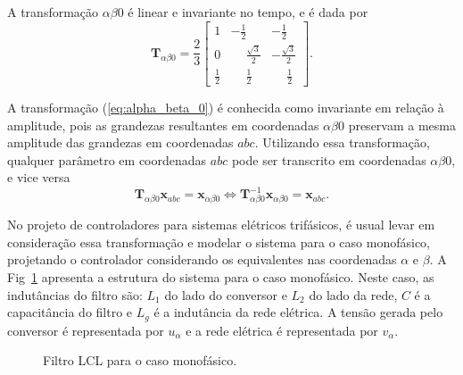   A transformação $\alpha \beta 0$ é linear e invariante no tempo, e é dada por
  \begin{equation}
    \mathbf{T}_{\alpha \beta 0} = \frac{2}{3} \left[
    \begin{array}{ccc}
      1 & -\frac{1}{2} & -\frac{1}{2} \\[0.3em]
      0 & \phantom{-}\frac{\sqrt{3}}{2} & -\frac{\sqrt{3}}{2} \\[0.3em]
      \frac{1}{2} &  \phantom{-}\frac{1}{2} & \phantom{-}\frac{1}{2}
    \end{array}
    \right] \text{.}
    \label{eq:alpha_beta_0}
  \end{equation}

  A transformação (\ref{eq:alpha_beta_0}) é conhecida como invariante em relação à amplitude, pois as grandezas resultantes em coordenadas $\alpha \beta 0$ preservam a mesma amplitude das grandezas em coordenadas $abc$. Utilizando essa transformação, qualquer parâmetro em coordenadas $abc$ pode ser transcrito em coordenadas $\alpha \beta 0$, e vice versa
  \begin{equation}
    \mathbf{T}_{\alpha \beta 0} \mathbf{x}_{abc} = \mathbf{x}_{\alpha \beta 0}
    \iff
    \mathbf{T}_{\alpha \beta 0}^{-1} \mathbf{x}_{\alpha \beta 0} = \mathbf{x}_{abc}
    \text{.}
  \end{equation}

  No projeto de controladores para sistemas elétricos trifásicos, é usual levar em consideração essa transformação e modelar o sistema para o caso monofásico, projetando o controlador considerando os equivalentes nas coordenadas $\alpha$ e $\beta$. A Fig~\ref{fig:LCL_geral} apresenta a estrutura do sistema para o caso monofásico. Neste caso, as indutâncias do filtro são: $L_1$ do lado do conversor e $L_2$ do lado da rede, $C$ é a capacitância do filtro e $L_g$ é a indutância da rede elétrica. A tensão gerada pelo conversor é representada por $u_{\alpha}$ e a rede elétrica é representada por
  $v_{\alpha}$.

  \begin{figure}[htb]
    \centering{
      \def\svgwidth{\textwidth}
      }
    \renewcommand\figurename{Fig.}
    \caption{Filtro LCL para o caso monofásico.}
    \label{fig:LCL_geral}
  \end{figure}

